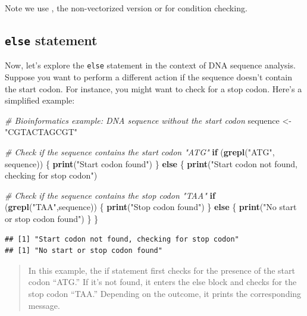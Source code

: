 \documentclass[
]{book}
\newenvironment{Shaded}{\begin{snugshade}}{\end{snugshade}}
\newcommand{\CommentTok}[1]{\textcolor[rgb]{0.56,0.35,0.01}{\textit{#1}}}
\newcommand{\ControlFlowTok}[1]{\textcolor[rgb]{0.13,0.29,0.53}{\textbf{#1}}}
\newcommand{\FunctionTok}[1]{\textcolor[rgb]{0.13,0.29,0.53}{\textbf{#1}}}
\newcommand{\NormalTok}[1]{#1}
\newcommand{\OtherTok}[1]{\textcolor[rgb]{0.56,0.35,0.01}{#1}}
\newcommand{\StringTok}[1]{\textcolor[rgb]{0.31,0.60,0.02}{#1}}
\begin{document}
Note we use \texttt{\textbar{}\textbar{}} , the non-vectorized version or for condition checking.

\hypertarget{else-statement}{%
\subsection{\texorpdfstring{\texttt{else} statement}{else statement}}\label{else-statement}}

Now, let's explore the \texttt{else} statement in the context of DNA sequence analysis. Suppose you want to perform a different action if the sequence doesn't contain the start codon. For instance, you might want to check for a stop codon. Here's a simplified example:

\begin{Shaded}
\begin{Highlighting}[]
\CommentTok{\# Bioinformatics example: DNA sequence without the start codon}
\NormalTok{sequence }\OtherTok{\textless{}{-}} \StringTok{"CGTACTAGCGT"}

\CommentTok{\# Check if the sequence contains the start codon "ATG"}
\ControlFlowTok{if}\NormalTok{ (}\FunctionTok{grepl}\NormalTok{(}\StringTok{"ATG"}\NormalTok{, sequence)) \{}
    \FunctionTok{print}\NormalTok{(}\StringTok{"Start codon found"}\NormalTok{)}
\NormalTok{\} }\ControlFlowTok{else}\NormalTok{ \{}
    \FunctionTok{print}\NormalTok{(}\StringTok{"Start codon not found, checking for stop codon"}\NormalTok{)}
    
    \CommentTok{\# Check if the sequence contains the stop codon "TAA"}
    \ControlFlowTok{if}\NormalTok{ (}\FunctionTok{grepl}\NormalTok{(}\StringTok{"TAA"}\NormalTok{,sequence)) \{}
        \FunctionTok{print}\NormalTok{(}\StringTok{"Stop codon found"}\NormalTok{)}
\NormalTok{    \} }\ControlFlowTok{else}\NormalTok{ \{}
        \FunctionTok{print}\NormalTok{(}\StringTok{"No start or stop codon found"}\NormalTok{)}
\NormalTok{    \}}
\NormalTok{\}}
\end{Highlighting}
\end{Shaded}

\begin{verbatim}
## [1] "Start codon not found, checking for stop codon"
## [1] "No start or stop codon found"
\end{verbatim}

\begin{quote}
In this example, the if statement first checks for the presence of the start codon ``ATG.'' If it's not found, it enters the else block and checks for the stop codon ``TAA.'' Depending on the outcome, it prints the corresponding message.
\end{quote}
\end{document}
